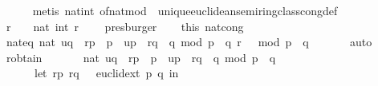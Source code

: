 \begin{isabellebody}
\ \ \ \ \isamarkupfalse%
\ {\isacharparenleft}{\kern0pt}metis\ nat{\isacharunderscore}{\kern0pt}int\ of{\isacharunderscore}{\kern0pt}nat{\isacharunderscore}{\kern0pt}mod\ \ unique{\isacharunderscore}{\kern0pt}euclidean{\isacharunderscore}{\kern0pt}semiring{\isacharunderscore}{\kern0pt}class{\isachardot}{\kern0pt}cong{\isacharunderscore}{\kern0pt}def{\isacharparenright}{\kern0pt}\isanewline
\isanewline
\ \ \isamarkupfalse%
\ {\isachardoublequoteopen}r\ {\isacharcircum}{\kern0pt}\ {}\ {\isacharequal}{\kern0pt}\ nat\ {\isacharparenleft}{\kern0pt}int\ {\isacharparenleft}{\kern0pt}r\ {\isacharcircum}{\kern0pt}\ {}{\isacharparenright}{\kern0pt}{\isacharparenright}{\kern0pt}{\isachardoublequoteclose}\ \isamarkupfalse%
\ presburger\isanewline
\ \ \isamarkupfalse%
\ this\ nat{\isacharunderscore}{\kern0pt}cong\ \isamarkupfalse%
\ nat{\isacharunderscore}{\kern0pt}eq{\isacharcolon}{\kern0pt}\ {\isachardoublequoteopen}nat\ {\isacharparenleft}{\kern0pt}{\isacharparenleft}{\kern0pt}{\isacharquery}{\kern0pt}uq\ {\isacharasterisk}{\kern0pt}\ r{\isacharunderscore}{\kern0pt}p\ {\isacharasterisk}{\kern0pt}\ p\ {\isacharplus}{\kern0pt}\ {\isacharquery}{\kern0pt}up\ {\isacharasterisk}{\kern0pt}\ r{\isacharunderscore}{\kern0pt}q\ {\isacharasterisk}{\kern0pt}\ q{\isacharparenright}{\kern0pt}\ mod\ {\isacharparenleft}{\kern0pt}p\ {\isacharasterisk}{\kern0pt}\ q{\isacharparenright}{\kern0pt}{\isacharparenright}{\kern0pt}\ {\isacharequal}{\kern0pt}r\ {\isacharcircum}{\kern0pt}\ {}\ mod\ {\isacharparenleft}{\kern0pt}p\ {\isacharasterisk}{\kern0pt}\ q{\isacharparenright}{\kern0pt}{\isachardoublequoteclose}\ \isanewline
\ \ \ \ \isamarkupfalse%
\ auto\isanewline
\ \ \isanewline
\ \ \isamarkupfalse%
\ r{\isacharunderscore}{\kern0pt}obtain\ \isamarkupfalse%
\ \isanewline
\ \ \ \ {\isachardoublequoteopen}nat\ {\isacharparenleft}{\kern0pt}{\isacharparenleft}{\kern0pt}{\isacharquery}{\kern0pt}uq\ {\isacharasterisk}{\kern0pt}\ r{\isacharunderscore}{\kern0pt}p\ {\isacharasterisk}{\kern0pt}\ p\ {\isacharplus}{\kern0pt}\ {\isacharquery}{\kern0pt}up\ {\isacharasterisk}{\kern0pt}\ r{\isacharunderscore}{\kern0pt}q\ {\isacharasterisk}{\kern0pt}\ q{\isacharparenright}{\kern0pt}\ mod\ {\isacharparenleft}{\kern0pt}p\ {\isacharasterisk}{\kern0pt}\ q{\isacharparenright}{\kern0pt}{\isacharparenright}{\kern0pt}\ {\isacharequal}{\kern0pt}\ \isanewline
\ \ \ \ \ \ {\isacharparenleft}{\kern0pt}let\ {\isacharparenleft}{\kern0pt}{\isacharparenleft}{\kern0pt}r{\isacharunderscore}{\kern0pt}p{\isacharcomma}{\kern0pt}\ r{\isacharunderscore}{\kern0pt}q{\isacharparenright}{\kern0pt}{\isacharcomma}{\kern0pt}\ {\isacharunderscore}{\kern0pt}{\isacharparenright}{\kern0pt}\ {\isacharequal}{\kern0pt}\ euclid{\isacharunderscore}{\kern0pt}ext\ p\ q\ in\ \isanewline

\end{isabellebody}
